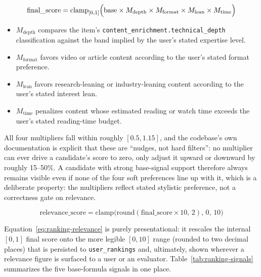 \begin{equation}
\text{final\_score} = \text{clamp}_{[0,1]}\Bigl(\text{base} \times M_{\text{depth}} \times M_{\text{format}} \times M_{\text{lean}} \times M_{\text{time}}\Bigr)
\label{eq:ranking-final}
\end{equation}

\begin{itemize}
  \item $M_{\text{depth}}$ compares the item's \texttt{content\_enrichment.technical\_depth} classification against the band implied by the user's stated expertise level.
  \item $M_{\text{format}}$ favors video or article content according to the user's stated format preference.
  \item $M_{\text{lean}}$ favors research-leaning or industry-leaning content according to the user's stated interest lean.
  \item $M_{\text{time}}$ penalizes content whose estimated reading or watch time exceeds the user's stated reading-time budget.
\end{itemize}

All four multipliers fall within roughly $[0.5, 1.15]$, and the codebase's own documentation is explicit that these are ``nudges, not hard filters'': no multiplier can ever drive a candidate's score to zero, only adjust it upward or downward by roughly 15--50\%. A candidate with strong base-signal support therefore always remains visible even if none of the four soft preferences line up with it, which is a deliberate property: the multipliers reflect stated stylistic preference, not a correctness gate on relevance.

\begin{equation}
\text{relevance\_score} = \text{clamp}\bigl(\text{round}(\text{final\_score} \times 10,\, 2),\, 0,\, 10\bigr)
\label{eq:ranking-relevance}
\end{equation}

Equation~\ref{eq:ranking-relevance} is purely presentational: it rescales the internal $[0,1]$ final score onto the more legible $[0,10]$ range (rounded to two decimal places) that is persisted to \texttt{user\_rankings} and, ultimately, shown wherever a relevance figure is surfaced to a user or an evaluator. Table~\ref{tab:ranking-signals} summarizes the five base-formula signals in one place.

